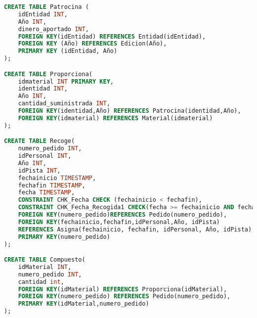 \begin{lstlisting}[language=sql]
CREATE TABLE Patrocina (
	idEntidad INT,
	Año INT,
	dinero_aportado INT,
	FOREIGN KEY(idEntidad) REFERENCES Entidad(idEntidad),
	FOREIGN KEY (Año) REFERENCES Edicion(Año),
	PRIMARY KEY (idEntidad, Año)
);

CREATE TABLE Proporciona(
	idmaterial INT PRIMARY KEY,
	identidad INT,
	Año INT,
	cantidad_suministrada INT,
	FOREIGN KEY(identidad,Año) REFERENCES Patrocina(identidad,Año),
	FOREIGN KEY(idmaterial) REFERENCES Material(idmaterial)
);

CREATE TABLE Recoge(
	numero_pedido INT,
	idPersonal INT,
	Año INT,
	idPista INT,
	fechainicio TIMESTAMP,
	fechafin TIMESTAMP,
	fecha TIMESTAMP,
	CONSTRAINT CHK_Fecha CHECK (fechainicio < fechafin),
	CONSTRAINT CHK_Fecha_Recogida1 CHECK(fecha >= fechainicio AND fecha <= fechafin),
	FOREIGN KEY(numero_pedido)REFERENCES Pedido(numero_pedido),
	FOREIGN KEY(fechainicio,fechafin,idPersonal,Año, idPista)
	REFERENCES Asigna(fechainicio, fechafin, idPersonal, Año, idPista),
	PRIMARY KEY(numero_pedido)
);

CREATE TABLE Compuesto(
	idMaterial INT,
	numero_pedido INT,
	cantidad int,
	FOREIGN KEY(idMaterial) REFERENCES Proporciona(idMaterial),
	FOREIGN KEY(numero_pedido) REFERENCES Pedido(numero_pedido),
	PRIMARY KEY(idMaterial,numero_pedido)
);
\end{lstlisting}
